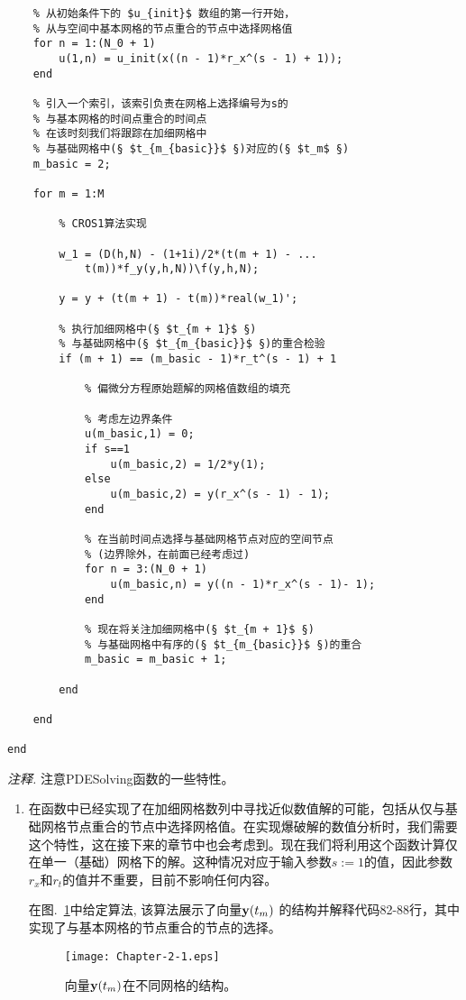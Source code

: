 \documentclass[twoside]{book}
\def\textbf{\bf}%
\begin{document}
\begin{CJK*}{GBK}{song}
\begin{lstlisting}
    % 从初始条件下的 $u_{init}$ 数组的第一行开始，
    % 从与空间中基本网格的节点重合的节点中选择网格值
    for n = 1:(N_0 + 1)
        u(1,n) = u_init(x((n - 1)*r_x^(s - 1) + 1));
    end

    % 引入一个索引，该索引负责在网格上选择编号为s的
    % 与基本网格的时间点重合的时间点
    % 在该时刻我们将跟踪在加细网格中
    % 与基础网格中(§ $t_{m_{basic}}$ §)对应的(§ $t_m$ §)
    m_basic = 2;

    for m = 1:M

        % CROS1算法实现

        w_1 = (D(h,N) - (1+1i)/2*(t(m + 1) - ...
            t(m))*f_y(y,h,N))\f(y,h,N);

        y = y + (t(m + 1) - t(m))*real(w_1)';

        % 执行加细网格中(§ $t_{m + 1}$ §)
        % 与基础网格中(§ $t_{m_{basic}}$ §)的重合检验
        if (m + 1) == (m_basic - 1)*r_t^(s - 1) + 1

            % 偏微分方程原始题解的网格值数组的填充

            % 考虑左边界条件
            u(m_basic,1) = 0;
            if s==1
                u(m_basic,2) = 1/2*y(1);
            else
                u(m_basic,2) = y(r_x^(s - 1) - 1);
            end

            % 在当前时间点选择与基础网格节点对应的空间节点
            % (边界除外，在前面已经考虑过)
            for n = 3:(N_0 + 1)
                u(m_basic,n) = y((n - 1)*r_x^(s - 1)- 1);
            end

            % 现在将关注加细网格中(§ $t_{m + 1}$ §)
            % 与基础网格中有序的(§ $t_{m_{basic}}$ §)的重合
            m_basic = m_basic + 1;

        end

    end

end
\end{lstlisting}

\emph{注释.} 注意PDESolving函数的一些特性。
\begin{enumerate}
    \item 在函数中已经实现了在加细网格数列中寻找近似数值解的可能，包括从仅与基础网格节点重合的节点中选择网格值。在实现爆破解的数值分析时，我们需要这个特性，这在接下来的章节中也会考虑到。现在我们将利用这个函数计算仅在单一（基础）网格下的解。这种情况对应于输入参数$s := 1$的值，因此参数$r_x$和$r_t$的值并不重要，目前不影响任何内容。

        在图.~\ref{Fig_2_1}中给定算法, 该算法展示了向量$\emph{\textbf{y}}(t_m)$ 的结构并解释代码82-88行，其中实现了与基本网格的节点重合的节点的选择。
        \begin{figure}[t]
            \centering
            \texttt{[image: Chapter-2-1.eps]}\\
            \caption{向量$\emph{\textbf{y}}(t_m)$在不同网格的结构。}
            \label{Fig_2_1}
        \end{figure}


\end{enumerate}
\end{CJK*}
\end{document}
